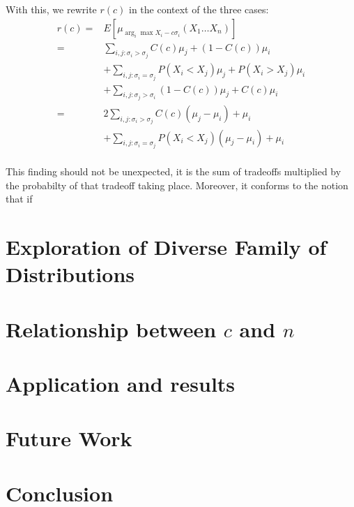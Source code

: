 \documentclass[11pt]{article}
\begin{document}
\begin{multicols}{2}
With this, we rewrite $r(c)$ in the context of the three cases:
$$
\begin{aligned}
r(c)=& E[\mu_{\arg_i\max X_i - c \sigma_i}(X_1 \dots X_n)]\\
= &\sum_{i,j: \sigma_i > \sigma_j}C(c)\mu_j + (1-C(c))\mu_i\\ %
& +\sum_{i,j: \sigma_i = \sigma_j}P(X_i < X_j)\mu_j + P(X_i > X_j)\mu_i\\
& +\sum_{i,j: \sigma_j > \sigma_i}(1-C(c))\mu_j + C(c)\mu_i\\ %
= & 2 \sum_{i,j: \sigma_i > \sigma_j}C(c)(\mu_j - \mu_i) + \mu_i\\ %
& +\sum_{i,j: \sigma_i = \sigma_j}P(X_i < X_j)(\mu_j - \mu_i) +\mu_i\\
\end{aligned}
$$

This finding should not be unexpected, it is the sum of tradeoffs multiplied by the probabilty of that tradeoff taking place.
Moreover, it conforms to the notion that if


%

\section{Exploration of Diverse Family of Distributions}

\section{Relationship between $c$ and $n$}

\section{Application and results}

\section{Future Work}

\section{Conclusion}

\end{multicols}
\end{document}
